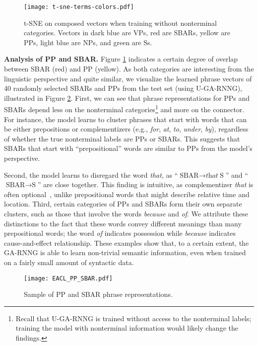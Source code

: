 \documentclass[11pt]{article}
\begin{document}
\begin{figure}[h]
\centering
\texttt{[image: t-sne-terms-colors.pdf]}
\caption{t-SNE on composed vectors when training without nonterminal categories. Vectors in dark blue are VPs, red are SBARs, yellow are PPs, light blue are NPs, and green are Ss. 
\label{fig:nt-cluster}}
\end{figure}

\textbf{Analysis of PP and SBAR.} Figure \ref{fig:nt-cluster} indicates a certain degree of overlap between SBAR (red) and PP (yellow). As both categories are interesting from the linguistic perspective and quite similar, we visualize the learned phrase vectors of 40 randomly selected SBARs and PPs from the test set (using U-GA-RNNG), illustrated in Figure \ref{fig:pp-sbar}. First, we can see that phrase representations for PPs and SBARs depend less on the nonterminal categories\footnote{Recall that U-GA-RNNG is trained without access to the nonterminal labels; training the model with nonterminal information would likely change the findings.} and more on the connector. For instance, the model learns to cluster phrases that start with words that can be either prepositions or complementizers (e.g., \emph{for}, \emph{at}, \emph{to}, \emph{under}, \emph{by}), regardless of whether the true nonterminal labels are PPs or SBARs. This suggests that SBARs that start with ``prepositional'' words are similar to PPs from the model's perspective.

Second, the model learns to disregard the word \emph{that}, as ``$\text{SBAR} \rightarrow \textit{that}\ \text{S}$'' and ``$\text{SBAR} \rightarrow \text{S}$'' are close together. This finding is intuitive, as complementizer \emph{that} is often optional~\cite{jaeger:2010}, unlike prepositional words that might describe relative time and location. Third, certain categories of PPs and SBARs form their own separate clusters, such as those that involve the words \emph{because} and \emph{of}. We attribute these distinctions to the fact that these words convey different meanings than many prepositional words; the word \emph{of} indicates possession while \emph{because} indicates cause-and-effect relationship. These examples show that, to a certain extent, the GA-RNNG is able to learn non-trivial semantic information, even when trained on a fairly small amount of syntactic data.

\begin{figure}[h]
\texttt{[image: EACL\_PP\_SBAR.pdf]}
\caption{Sample of PP and SBAR phrase representations.
\label{fig:pp-sbar}}
\end{figure}
\end{document}
